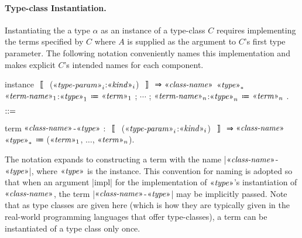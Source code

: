 \paragraph{Type-class Instantiation.}
Instantiating the a type $α$ as an instance of a type-class $C$ requires implementing the terms specified by $C$ where $A$ is supplied as the argument to $C$'s first type parameter.
The following notation conveniently names this implementation and makes explicit $C$'s intended names for each component.
\begin{notational}[caption={Notation for type-class instantiation}, label={lst:notation-type-class-inst}]
instance $〚$ ($\mvar{type-param}_i$:$\mvar{kind}_i$) $〛$ ⇒ $\mvar{class-name}$ $\mvar{type}_*$
  { $\mvar{term-name}_1$:$\mvar{type}_1$ ≔ $\mvar{term}_1$ ; $\cdots$ ; $\mvar{term-name}_n$:$\mvar{type}_n$ ≔ $\mvar{term}_n$ }.

$\syneq$

term $\mvar{class-name}$-$\mvar{type}$
  : $〚$ ($\mvar{type-param}_i$:$\mvar{kind}_i$) $〛$ ⇒ $\mvar{class-name}$ $\mvar{type}_*$
  ≔ ($\mvar{term}_1$, $\dots$, $\mvar{term}_n$).
\end{notational}
The notation expands to constructing a term with the name \code|$\mvar{class-name}$-$\mvar{type}$|, where $\mvar{type}$ is the instance.
This convention for naming is adopted so that when an argument \code|impl| for the implementation of $\mvar{type}$'s instantiation of $\mvar{class-name}$, the term \code|$\mvar{class-name}$-$\mvar{type}$| may be implicitly passed.
Note that as type classes are given here (which is how they are typically given in the real-world programming languages that offer type-classes), a term can be instantiated of a type class only once.

